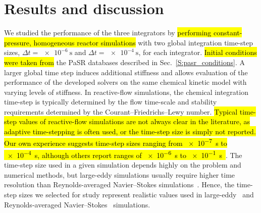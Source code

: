 \documentclass[preprint,review,11pt]{elsarticle}
\DeclareRobustCommand{\hlb}[1]{\sethlcolor{SkyBlue}\hl{#1}}
\DeclareRobustCommand{\hlg}[1]{\sethlcolor{green}\hl{#1}}
\begin{document}
\section{Results and discussion}
\label{S:results}

We studied the performance of the three integrators by \hlg{performing constant-pressure, homogeneous reactor simulations} with two global integration time-step sizes, $\Delta t = \SI{e-6}{\s}$ and $\Delta t = \SI{e-4}{\s}$, for each integrator. \hlg{Initial conditions were taken from} the PaSR databases described in Sec.~\ref{S:pasr_conditions}.
A larger global time step induces additional stiffness and allows evaluation of the performance of the developed solvers on the same chemical kinetic model with varying levels of stiffness.
In reactive-flow simulations, the chemical integration time-step is typically determined by the flow time-scale and stability requirements determined by the Courant--Friedrichs--Lewy number.
\hlb{Typical time-step values of reactive-flow simulations are not always clear in the literature, as adaptive time-stepping is often used, or the time-step size is simply not reported.
Our own experience suggests time-step sizes ranging from {\SI{e-7}{\s}} to {\SI{e-4}{\s}}, although others report ranges of {\SI{e-6}{\s}} to {\SI{e-1}{\s}}~\cite{Yang:2013ip}}.
The time-step size used in a given simulation depends highly on the problem and numerical methods, but large-eddy simulations usually require higher time resolution than Reynolds-averaged Navier--Stokes simulations~\cite{Iaccarino:2003147}.
Hence, the time-step sizes we selected for study represent realistic values used in large-eddy~\cite{Wang20111319,Bulat20133155} and Reynolds-averaged Navier--Stokes~\cite{Ramirez2010,Galloni20091131} simulations.
\end{document}

